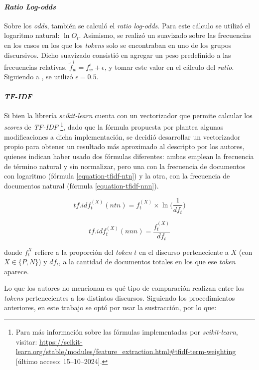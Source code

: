 \paragraph{\textit{Ratio} \textit{Log-odds}}
Sobre los \textit{odds}, tambi\'en se calcul\'o el \textit{ratio log-odds}.
Para este c\'alculo se utiliz\'o el logaritmo natural: $\ln{O_t}$.
Asimismo, se realiz\'o un suavizado sobre las frecuencias en los casos
en los que los \textit{tokens} solo se encontraban en uno de los grupos
discursivos. Dicho suavizado consisti\'o en agregar un peso predefinido a las
frecuencias relativas, $\tilde{f}^{i}_{w} = f^{i}_{w}+\epsilon$, y tomar
este valor en el c\'alculo del \textit{ratio}. Siguiendo a \cite{monroe2008fightin},
se utiliz\'o $\epsilon=0.5$.

\paragraph{\textit{TF-IDF}}
\label{paragraph-methods-tfidf}
Si bien la librer\'ia \textit{scikit-learn} cuenta con un vectorizador
que permite calcular los \textit{scores} de \textit{TF-IDF}
\footnote{Para m\'as informaci\'on sobre las f\'ormulas
implementadas por \textit{scikit-learn}, visitar:
\url{https://scikit-learn.org/stable/modules/feature_extraction.html\#tfidf-term-weighting} [\'ultimo acceso: 15--10--2024].},
dado que la f\'ormula propuesta por  plantea
algunas modificaciones a dicha implementaci\'on, se decidi\'o
desarrollar un vectorizador propio para obtener un resultado
m\'as aproximado al descripto por los autores, quienes indican haber usado
dos f\'ormulas diferentes: ambas emplean la frecuencia
de t\'ermino natural y sin normalizar, pero una con la frecuencia de documentos
con logaritmo (f\'ormula \ref{equation-tfidf-ntn}) y la otra, con la frecuencia
de documentos natural (f\'ormula \ref{equation-tfidf-nnn}).

\begin{equation}
\label{equation-tfidf-ntn}
    tf.idf_{t}^{(X)}(ntn) = f_{t}^{(X)} \times \ln\bigg({\frac{1}{df_{t}}}\bigg)
\end{equation}

\begin{equation}
\label{equation-tfidf-nnn}
    tf.idf_{t}^{(X)}(nnn) = \frac{f_{t}^{(X)}}{df_{t}}
\end{equation}

donde $f_{t}^{X}$ refiere a la proporci\'on del \textit{token} $t$
en el discurso perteneciente a $X$
(con $X \in \lbrace P,N \rbrace$) y $df_t$, a la cantidad
de documentos totales en los que ese \textit{token} aparece.
\par
Lo que los autores no mencionan es qu\'e tipo de comparaci\'on realizan
entre los \textit{tokens} pertenecientes a los distintos discursos.
Siguiendo los procedimientos anteriores, en este trabajo se opt\'o por usar
la sustracci\'on, por lo que:

